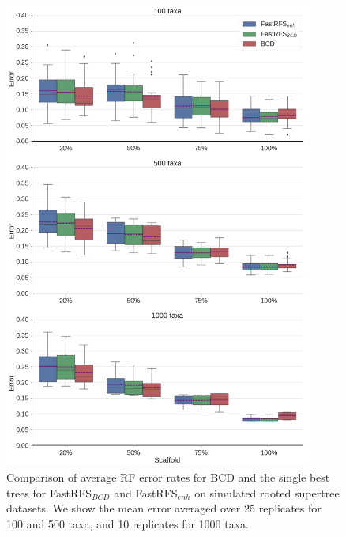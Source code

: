 \begin{figure}
  \centering
  \includegraphics[width=0.9\textwidth,height=0.8\textheight,keepaspectratio]{siesta-supp-figs/fastrfs_nosiesta_smidgenOG_error}
  \caption[Comparison of average RF error rates for  BCD and the single best trees for FastRFS$_{BCD}$ and FastRFS$_{enh}$ on simulated
    rooted supertree datasets.]{Comparison of average RF error rates for  BCD and the single best trees for FastRFS$_{BCD}$ and FastRFS$_{enh}$ on simulated
    rooted supertree datasets. We show the mean error
    averaged over 25 replicates for 100 and 500 taxa, and 10
    replicates for 1000 taxa.}
  \label{fig:supertree-consensus-comparison-6}
\end{figure}



